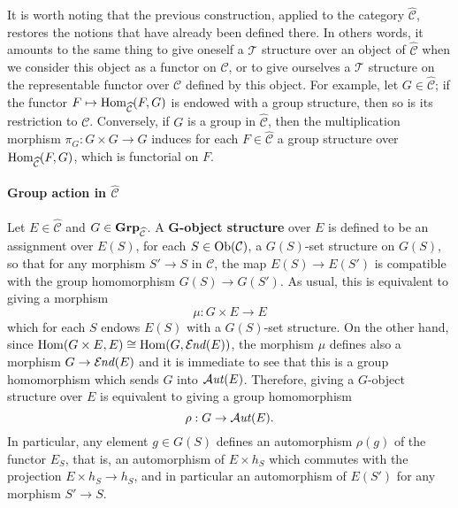 \begin{remark}
It is worth noting that the previous construction, applied to the category $\widehat{\mathcal{C}}$, restores the notions that have already been defined there. In others words, it amounts to the same thing to give oneself a $\mathcal{T}$ structure over an object of $\widehat{\mathcal{C}}$ when we consider this object as a functor on $\mathcal{C}$, or to give ourselves a $\mathcal{T}$ structure on the representable functor over $\mathcal{C}$ defined by this object. For example, let $G\in\widehat{\mathcal{C}}$; if the functor $F\mapsto\mathrm{Hom}_{\widehat{\mathcal{C}}}(F,G)$ is endowed with a group structure, then so is its restriction to $\mathcal{C}$. Conversely, if $G$ is a group in $\widehat{\mathcal{C}}$, then the multiplication morphism $\pi_G:G\times G\to G$ induces for each $F\in\widehat{\mathcal{C}}$ a group structure over $\mathrm{Hom}_{\widehat{\mathcal{C}}}(F,G)$, which is functorial on $F$.
\end{remark}

\paragraph{Group action in \texorpdfstring{$\widehat{\mathcal{C}}$}{PSh}}\label{category group action in PSh paragraph}
Let $E\in\widehat{\mathcal{C}}$ and $G\in\mathbf{Grp}_{\widehat{\mathcal{C}}}$. A \textbf{$\bm{G}$-object structure} over $E$ is defined to be an assignment over $E(S)$, for each $S\in\mathrm{Ob}(\mathcal{C})$, a $G(S)$-set structure on $G(S)$, so that for any morphism $S'\to S$ in $\mathcal{C}$, the map $E(S)\to E(S')$ is compatible with the group homomorphism $G(S)\to G(S')$. As usual, this is equivalent to giving a morphism
\[\mu:G\times E\to E\]
which for each $S$ endows $E(S)$ with a $G(S)$-set structure. On the other hand, since $\mathrm{Hom}(G\times E,E)\cong\mathrm{Hom}(G,\operatorname{\mathcal{E}\hspace*{-1pt}\textit{nd}\hspace{0.5pt}}(E))$, the morphism $\mu$ defines also a morphism $G\to\operatorname{\mathcal{E}\hspace*{-1pt}\textit{nd}\hspace{0.5pt}}(E)$ and it is immediate to see that this is a group homomorphism which sends $G$ into $\operatorname{\mathcal{A}\hspace*{-0.2pt}\textit{ut}\hspace{0.5pt}}(E)$. Therefore, giving a $G$-object structure over $E$ is equivalent to giving a group homomorphism
\[\rho:G\to\operatorname{\mathcal{A}\hspace*{-0.2pt}\textit{ut}\hspace{0.5pt}}(E).\]
In particular, any element $g\in G(S)$ defines an automorphism $\rho(g)$ of the functor $E_S$, that is, an automorphism of $E\times h_S$ which commutes with the projection $E\times h_S\to h_S$, and in particular an automorphism of $E(S')$ for any morphism $S'\to S$.

